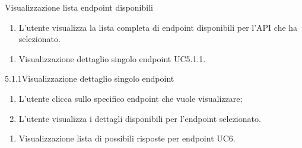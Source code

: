 \begin{usecase}{5.1}{Visualizzazione lista endpoint disponibili}\label{uc:visualizzazione-lista-endpoint-disponibili}

    \usecasemain{}
        \begin{enumerate}
            \item L'utente visualizza la lista completa di endpoint disponibili per l'API che ha selezionato.
        \end{enumerate}

    \usecasegen{}
        \begin{enumerate}
            \item Visualizzazione dettaglio singolo endpoint UC5.1.1.
        \end{enumerate}

\end{usecase}


\begin{usecase}{5.1.1}{Visualizzazione dettaglio singolo endpoint}\label{uc:visualizzazione-dettaglio-singolo-endpoint}

    \usecasemain{}
        \begin{enumerate}
            \item L'utente clicca sullo specifico endpoint che vuole visualizzare;
            \item L'utente visualizza i dettagli disponibili per l'endpoint selezionato.
        \end{enumerate}

    \usecaseext{}
        \begin{enumerate}
            \item Visualizzazione lista di possibili risposte per endpoint UC6.
        \end{enumerate}

\end{usecase}


